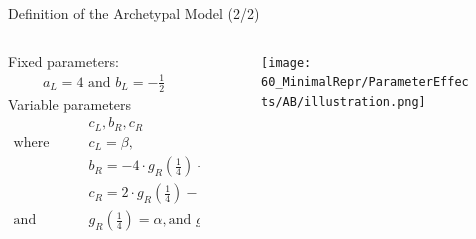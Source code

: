 \begin{frame}{Definition of the Archetypal Model (2/2)}
	\vspace{-1em}
	\begin{columns}
		\begin{column}{.7 \textwidth}
			Fixed parameters:
			\begin{align*}
				a_L = 4 \text{ and } b_L = -\tfrac{1}{2}
			\end{align*}
			Variable parameters
			\begin{align*}
				 & c_L, b_R, c_R                                                                                                              \\
				\text{where} \qquad
				 & c_L = \beta,                                                                                                               \\
				 & b_R = -4 \cdot g_R\left(\tfrac{1}{4}\right) + 4 \cdot g_R\left(\tfrac{1}{2}\right),                                        \\
				 & c_R = 2 \cdot g_R\left(\tfrac{1}{4}\right) - 1 \cdot g_R\left(\tfrac{1}{2}\right),                                         \\[1em]
				\text{and} \qquad
				 & g_R\left(\tfrac{1}{4}\right) = \alpha, \text{and } g_R\left(\tfrac{1}{2}\right) = \tfrac{1}{2} + \epsilon \text{ is fixed}
			\end{align*}
		\end{column}
		\begin{column}{.3 \textwidth}
			\begin{figure}
				\centering
				\texttt{[image: 60\_MinimalRepr/ParameterEffects/AB/illustration.png]}
			\end{figure}
		\end{column}
	\end{columns}
\end{frame}

